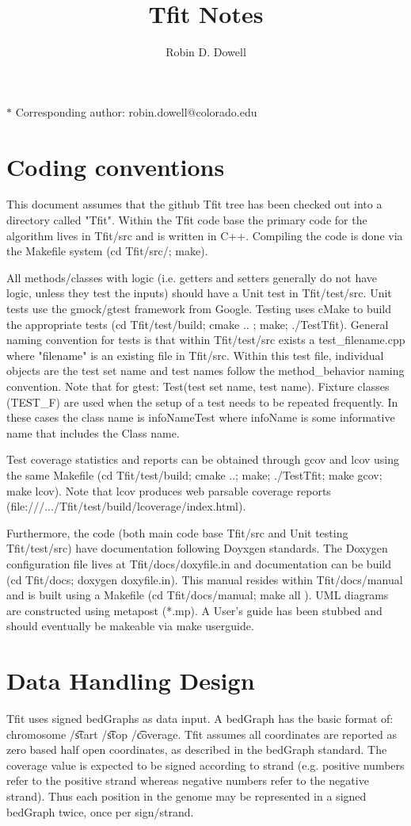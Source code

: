 \documentclass[11pt]{article}
\title{Tfit Notes}
\author{Robin D. Dowell}
\date{}
\date{ }
\begin{document}
\maketitle
\noindent $*$ Corresponding author: robin.dowell@colorado.edu

\section{Coding conventions}
This document assumes that the github Tfit tree has been checked out into a 
directory called "Tfit".   Within the Tfit code base the primary code for the 
algorithm lives in Tfit/src and is written in C++.   Compiling the code is 
done via the Makefile system (cd Tfit/src/; make). 

All methods/classes with logic (i.e. getters and setters generally do not 
have logic, unless they test the inputs) should have a Unit test in 
Tfit/test/src.  Unit tests use the gmock/gtest framework from Google.   
Testing uses cMake to build the appropriate tests (cd Tfit/test/build; 
cmake .. ; make; ./TestTfit).  General naming convention for tests is that
within Tfit/test/src exists a test\_filename.cpp where "filename" is an
existing file in Tfit/src.   Within this test file, individual objects
are the test set name and test names follow the method\_behavior naming 
convention.  Note that for gtest: Test(test set name, test name).  Fixture
classes (TEST\_F) are used when the setup of a test needs to be 
repeated frequently.  In these cases the class name is infoNameTest where
infoName is some informative name that includes the Class name.

Test coverage statistics and reports can be obtained through gcov
and lcov using the same Makefile (cd Tfit/test/build; cmake ..; make;
./TestTfit; make gcov; make lcov).  Note that lcov produces web parsable
coverage reports (file:///.../Tfit/test/build/lcoverage/index.html).

Furthermore, the code (both main code base Tfit/src and Unit testing 
    Tfit/test/src) have documentation following Doyxgen standards.   
The Doxygen configuration file
lives at Tfit/docs/doxyfile.in and documentation can be build (cd Tfit/docs; 
    doxygen doxyfile.in).   This manual resides within Tfit/docs/manual and 
is built using a Makefile (cd Tfit/docs/manual; make all ).  UML diagrams are
constructed using metapost (*.mp).  A User's guide has been stubbed and should
eventually be makeable via make userguide.

\section{Data Handling Design}
Tfit uses signed bedGraphs as data input.  A bedGraph has the basic format of: 
chromosome /\t start /\t stop /\t coverage.  Tfit assumes all coordinates are
reported as zero based half open coordinates, as described in the bedGraph standard.  
The coverage value is expected to be signed according to strand (e.g. positive 
numbers refer to the positive strand whereas negative numbers refer to the 
negative strand).  Thus each position in the genome may be represented in a 
signed bedGraph twice, once per sign/strand.
\end{document}
